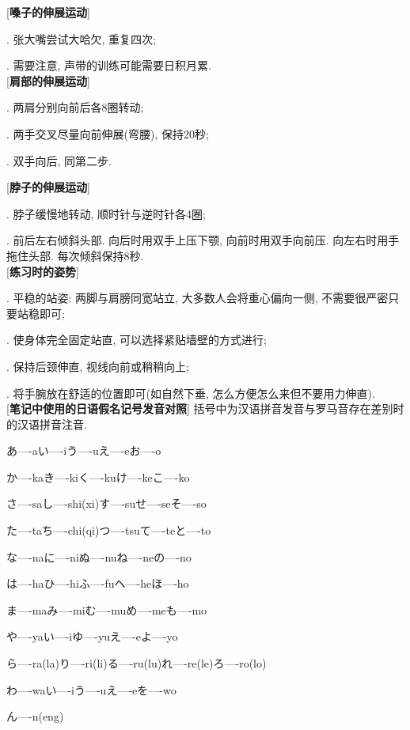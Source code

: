 [\textbf{嗓子的伸展运动}]\par
{}. 张大嘴尝试大哈欠, 重复四次;\par
{}. 需要注意, 声带的训练可能需要日积月累.\\

[\textbf{肩部的伸展运动}]\par
{}. 两肩分别向前后各8圈转动;\par
{}. 两手交叉尽量向前伸展(弯腰), 保持20秒;\par
{}. 双手向后, 同第二步.\\

\clearpage

[\textbf{脖子的伸展运动}]\par
{}. 脖子缓慢地转动, 顺时针与逆时针各4圈;\par
{}. 前后左右倾斜头部. 向后时用双手上压下颚, 向前时用双手向前压. 向左右时用手拖住头部. 每次倾斜保持8秒.\\

[\textbf{练习时的姿势}]\par
{}. 平稳的站姿: 两脚与肩膀同宽站立, 大多数人会将重心偏向一侧, 不需要很严密只要站稳即可;\par
{}. 使身体完全固定站直, 可以选择紧贴墙壁的方式进行;\par
{}. 保持后颈伸直, 视线向前或稍稍向上;\par
{}. 将手腕放在舒适的位置即可(如自然下垂, 怎么方便怎么来但不要用力伸直).\\

[\textbf{笔记中使用的日语假名记号发音对照}] 括号中为汉语拼音发音与罗马音存在差别时的汉语拼音注音.\par
\qquad あ----a\qquad い----i\qquad う----u\qquad え----e\qquad お----o\par
\qquad か----ka\qquad き----ki\qquad く----ku\qquad け----ke\qquad こ----ko\par
\qquad さ----sa\qquad し----shi(xi)\qquad す----su\qquad せ----se\qquad そ----so\par
\qquad た----ta\qquad ち----chi(qi)\qquad つ----tsu\qquad て----te\qquad と----to\par
\qquad な----na\qquad に----ni\qquad ぬ----nu\qquad ね----ne\qquad の----no\par
\qquad は----ha\qquad ひ----hi\qquad ふ----fu\qquad へ----he\qquad ほ----ho\par
\qquad ま----ma\qquad み----mi\qquad む----mu\qquad め----me\qquad も----mo\par
\qquad や----ya\qquad い----i\qquad ゆ----yu\qquad え----e\qquad よ----yo\par
\qquad ら----ra(la)\qquad り----ri(li)\qquad る----ru(lu)\qquad れ----re(le)\qquad ろ----ro(lo)\par
\qquad わ----wa\qquad い----i\qquad う----u\qquad え----e\qquad を----wo\par
\qquad ん----n(eng)\\

